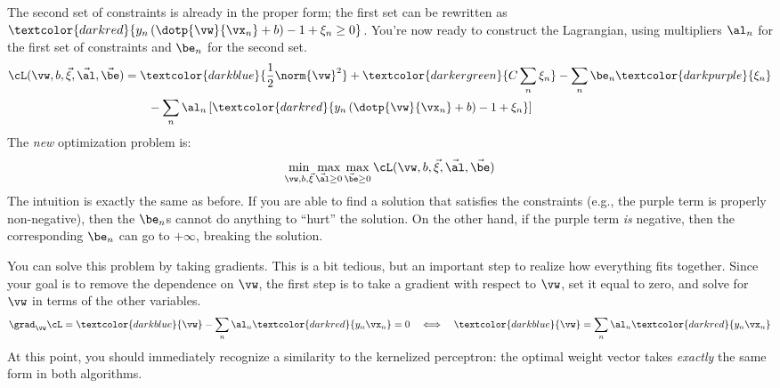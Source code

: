 The second set of constraints is already in the proper form; the first
set can be rewritten as $\textcolor{darkred}{y_n \left(
    \dotp{\vw}{\vx_n} + b \right) - 1 + \xi_n \geq 0}$.  You're now
ready to construct the Lagrangian, using multipliers $\al_n$ for the
first set of constraints and $\be_n$ for the second set.
%
\begin{align}
\cL(\vw,b,\vec\xi,\vec\al,\vec\be)
&=
  \textcolor{darkblue}{\frac 1 2 \norm{\vw}^2}
+ \textcolor{darkergreen}{C \sum_n \xi_n}
- \sum_n \be_n \textcolor{darkpurple}{\xi_n}
\\&\qquad
- \sum_n \al_n \left[
    \textcolor{darkred}{y_n \left( \dotp{\vw}{\vx_n} + b \right) - 1 + \xi_n}
  \right]
\end{align}
%
The \emph{new} optimization problem is:
%
\begin{align}
\min_{\vw,b,\vec\xi} \max_{\vec\al \geq 0} \max_{\vec\be \geq 0} \cL(\vw,b,\vec\xi,\vec\al,\vec\be)
\end{align}
%
The intuition is exactly the same as before.  If you are able to find
a solution that satisfies the constraints (e.g., the purple term is
properly non-negative), then the $\be_n$s cannot do anything to
``hurt'' the solution.  On the other hand, if the purple term
\emph{is} negative, then the corresponding $\be_n$ can go to
$+\infty$, breaking the solution.

You can solve this problem by taking gradients.  This is a bit
tedious, but an important step to realize how everything fits
together.  Since your goal is to remove the dependence on $\vw$, the
first step is to take a gradient with respect to $\vw$, set it equal
to zero, and solve for $\vw$ in terms of the other variables.
%
\begin{align}
\grad_{\vw} \cL
= \textcolor{darkblue}{\vw}
  - \sum_n \al_n \textcolor{darkred}{y_n \vx_n}
= 0 \quad\Longleftrightarrow\quad
\textcolor{darkblue}{\vw}
= \sum_n \al_n \textcolor{darkred}{y_n \vx_n}
\end{align}
%
At this point, you should immediately recognize a similarity to the
kernelized perceptron: the optimal weight vector takes \emph{exactly}
the same form in both algorithms.

